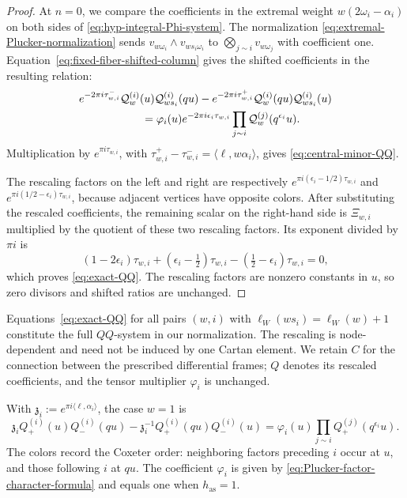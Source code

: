 \documentclass[11pt,leqno]{amsart}
\numberwithin{equation}{section}
\theoremstyle{plain}
\theoremstyle{definition}
\theoremstyle{plain}
\theoremstyle{definition}
\theoremstyle{remark}
\begin{document}
\begin{proof}
At $n=0$, we compare the coefficients in the extremal weight $w(2\omega_i-\alpha_i)$ on both sides of \eqref{eq:hyp-integral-Phi-system}. The normalization \eqref{eq:extremal-Plucker-normalization} sends $v_{w\omega_i}\wedge v_{ws_i\omega_i}$ to $\bigotimes_{j\sim i}v_{w\omega_j}$ with coefficient one. Equation~\eqref{eq:fixed-fiber-shifted-column} gives the shifted coefficients in the resulting relation:
\[
 \begin{aligned}
 &e^{-2\pi i\tau_{w,i}^{-}}\mathcal Q_w^{(i)}(u)
       \mathcal Q_{ws_i}^{(i)}(qu)
 -e^{-2\pi i\tau_{w,i}^{+}}\mathcal Q_w^{(i)}(qu)
       \mathcal Q_{ws_i}^{(i)}(u)\\
 &\hspace{20mm}=\varphi_i(u)e^{-2\pi i\epsilon_i\tau_{w,i}}
       \prod_{j\sim i}\mathcal Q_w^{(j)}(q^{\epsilon_i}u).
 \end{aligned}
\]
Multiplication by $e^{\pi i\tau_{w,i}}$, with
$\tau_{w,i}^{+}-\tau_{w,i}^{-}=\langle\ell,w\alpha_i\rangle$, gives \eqref{eq:central-minor-QQ}.

The rescaling factors on the left and right are respectively
$e^{\pi i(\epsilon_i-1/2)\tau_{w,i}}$ and
$e^{\pi i(1/2-\epsilon_i)\tau_{w,i}}$, because adjacent vertices have opposite colors.  After substituting the rescaled coefficients, the remaining scalar on the right-hand side is $\Xi_{w,i}$ multiplied by the quotient of these two rescaling factors. Its exponent divided by $\pi i$ is
\[
 (1-2\epsilon_i)\tau_{w,i}
 +(\epsilon_i-\tfrac12)\tau_{w,i}
 -(\tfrac12-\epsilon_i)\tau_{w,i}=0,
\]
which proves \eqref{eq:exact-QQ}.  The rescaling factors are nonzero constants in $u$, so zero divisors and shifted ratios are unchanged.
\end{proof}

Equations~\eqref{eq:exact-QQ} for all pairs $(w,i)$ with $\ell_W(ws_i)=\ell_W(w)+1$ constitute the full $QQ$-system \cite[Definition~3.18]{KZ2021} in our normalization.  The rescaling is node-dependent and need not be induced by one Cartan element.  We retain $C$ for the connection between the prescribed differential frames; $Q$ denotes its rescaled coefficients, and the tensor multiplier $\varphi_i$ is unchanged.

With $\mathfrak z_i:=e^{\pi i\langle\ell,\alpha_i\rangle}$, the case $w=1$ is
\begin{equation}\label{eq:oriented-standard-QQ}
 \mathfrak z_iQ_+^{(i)}(u)Q_-^{(i)}(qu)
 -\mathfrak z_i^{-1}Q_+^{(i)}(qu)Q_-^{(i)}(u)
 =\varphi_i(u)
 \prod_{j\sim i}Q_+^{(j)}\!\left(q^{\epsilon_i}u\right).
\end{equation}
The colors record the Coxeter order: neighboring factors preceding $i$ occur at $u$, and those following $i$ at $qu$.  The coefficient $\varphi_i$ is given by \eqref{eq:Plucker-factor-character-formula} and equals one when $h_{\mathrm{as}}=1$.
\end{document}
